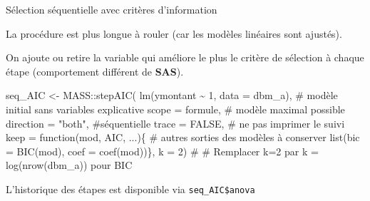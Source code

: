 \documentclass[
  ignorenonframetext,
]{beamer}
\newenvironment{Shaded}{\begin{snugshade}}{\end{snugshade}}
\newcommand{\AttributeTok}[1]{\textcolor[rgb]{0.40,0.45,0.13}{#1}}
\newcommand{\CommentTok}[1]{\textcolor[rgb]{0.37,0.37,0.37}{#1}}
\newcommand{\ConstantTok}[1]{\textcolor[rgb]{0.56,0.35,0.01}{#1}}
\newcommand{\ControlFlowTok}[1]{\textcolor[rgb]{0.00,0.23,0.31}{#1}}
\newcommand{\DecValTok}[1]{\textcolor[rgb]{0.68,0.00,0.00}{#1}}
\newcommand{\FunctionTok}[1]{\textcolor[rgb]{0.28,0.35,0.67}{#1}}
\newcommand{\NormalTok}[1]{\textcolor[rgb]{0.00,0.23,0.31}{#1}}
\newcommand{\OtherTok}[1]{\textcolor[rgb]{0.00,0.23,0.31}{#1}}
\newcommand{\SpecialCharTok}[1]{\textcolor[rgb]{0.37,0.37,0.37}{#1}}
\newcommand{\StringTok}[1]{\textcolor[rgb]{0.13,0.47,0.30}{#1}}
\begin{document}
\begin{frame}[fragile]{Sélection séquentielle avec critères
d'information}
\protect\hypertarget{suxe9lection-suxe9quentielle-avec-crituxe8res-dinformation}{}
\footnotesize

La procédure est plus longue à rouler (car les modèles linéaires sont
ajustés).

On ajoute ou retire la variable qui améliore le plus le critère de
sélection à chaque étape (comportement différent de \textbf{SAS}).

\begin{Shaded}
\begin{Highlighting}[numbers=left,,]
\NormalTok{seq\_AIC }\OtherTok{\textless{}{-}}\NormalTok{ MASS}\SpecialCharTok{::}\FunctionTok{stepAIC}\NormalTok{(}
  \FunctionTok{lm}\NormalTok{(ymontant }\SpecialCharTok{\textasciitilde{}} \DecValTok{1}\NormalTok{, }\AttributeTok{data =}\NormalTok{ dbm\_a), }
  \CommentTok{\# modèle initial sans variables explicative}
    \AttributeTok{scope =}\NormalTok{ formule, }\CommentTok{\# modèle maximal possible}
    \AttributeTok{direction =} \StringTok{"both"}\NormalTok{, }\CommentTok{\#séquentielle}
    \AttributeTok{trace =} \ConstantTok{FALSE}\NormalTok{, }\CommentTok{\# ne pas imprimer le suivi}
    \AttributeTok{keep =} \ControlFlowTok{function}\NormalTok{(mod, AIC, ...)\{ }
      \CommentTok{\# autres sorties des modèles à conserver}
      \FunctionTok{list}\NormalTok{(}\AttributeTok{bic =} \FunctionTok{BIC}\NormalTok{(mod), }
           \AttributeTok{coef =} \FunctionTok{coef}\NormalTok{(mod))\},}
    \AttributeTok{k =} \DecValTok{2}\NormalTok{) }\CommentTok{\#}
\CommentTok{\# Remplacer k=2 par k = log(nrow(dbm\_a)) pour BIC}
\end{Highlighting}
\end{Shaded}

L'historique des étapes est disponible via \texttt{seq\_AIC\$anova}

\normalsize
\end{frame}
\end{document}
